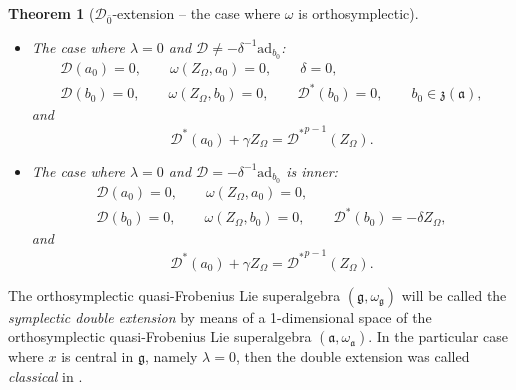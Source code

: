 \documentclass[pdftex]{sigma}
\numberwithin{equation}{section}
\newtheorem{Theorem}{Theorem}[section]
\begin{document}
\begin{Theorem}[${\mathscr D}_{\bar 0}$-extension -- the case where $\omega$ is orthosymplectic]
\begin{itemize}
\begin{itemize}
\item[$(b)$] The case where $\lambda=0$ and ${\mathscr D}\not =-\delta^{-1}\mathrm{ad}_{b_0}$:
\begin{gather*}
{\mathscr D}(a_0) = 0, \qquad \omega(Z_\Omega, a_0)=0, \qquad\delta = 0, \\
 {\mathscr D}(b_0) = 0,\qquad \omega(Z_\Omega, b_0)=0, \qquad {\mathscr D}^*(b_0) = 0, \qquad b_0\in {\mathfrak z}(\mathfrak{a}),
 \end{gather*}
and
\begin{equation}
\label{eqst2}
{\mathscr D}^*(a_0)+\gamma Z_\Omega= {{\mathscr D}^*}^{p-1}(Z_\Omega).
\end{equation}

\item[$(c)$] The case where $\lambda=0$ and ${\mathscr D}=-\delta^{-1}\mathrm{ad}_{b_0}$ is inner:
\begin{gather*}
{\mathscr D}(a_0) = 0, \qquad \omega(Z_\Omega, a_0)=0, \\
 {\mathscr D}(b_0) = 0, \qquad\omega(Z_\Omega, b_0)=0, \qquad {\mathscr D}^*(b_0) = -\delta Z_\Omega,
 \end{gather*}
and
\begin{equation}
\label{eqst3}
{\mathscr D}^*(a_0)+\gamma Z_\Omega= {{\mathscr D}^*}^{p-1}(Z_\Omega).
\end{equation}
\end{itemize}
\end{itemize}
\end{Theorem}
The orthosymplectic quasi-Frobenius Lie superalgebra $(\mathfrak{g}, \omega_\mathfrak{g})$ will be called the {\it symplectic double extension} by means of a 1-dimensional space of the orthosymplectic quasi-Frobenius Lie superalgebra $(\mathfrak{a}, \omega_\mathfrak{a})$. In the particular case where $x$ is central in $\mathfrak{g}$, namely $\lambda=0$, then the double extension was called {\it classical} in \cite{BaBe, DM1}.
\end{document}

